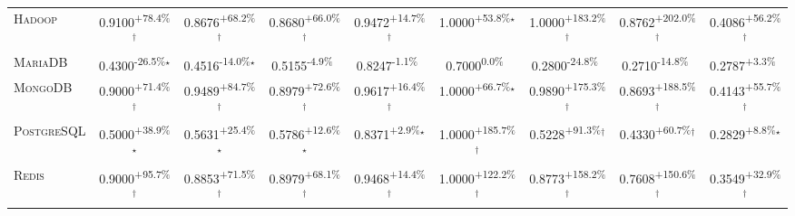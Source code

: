 \begin{table}[htbp]
\begin{tabular}{l|cccc|cccc}
\textsc{Hadoop} & \cellcolor{green!30}0.9100\textsuperscript{+78.4\%}$^\dagger$ & \cellcolor{green!30}0.8676\textsuperscript{+68.2\%}$^\dagger$ & \cellcolor{green!30}0.8680\textsuperscript{+66.0\%}$^\dagger$ & \cellcolor{green!30}0.9472\textsuperscript{+14.7\%}$^\dagger$ & \cellcolor{green!30}1.0000\textsuperscript{+53.8\%}$^\star$ & \cellcolor{green!30}1.0000\textsuperscript{+183.2\%}$^\dagger$ & \cellcolor{green!30}0.8762\textsuperscript{+202.0\%}$^\dagger$ & \cellcolor{green!30}0.4086\textsuperscript{+56.2\%}$^\dagger$ \\
\textsc{MariaDB} & \cellcolor{red!30}0.4300\textsuperscript{-26.5\%}$^\star$ & \cellcolor{red!30}0.4516\textsuperscript{-14.0\%}$^\star$ & \cellcolor{red!30}0.5155\textsuperscript{-4.9\%}$^{\,\,\,}$ & \cellcolor{red!30}0.8247\textsuperscript{-1.1\%}$^{\,\,\,}$ & \cellcolor{red!30}0.7000\textsuperscript{0.0\%}$^{\,\,\,}$ & \cellcolor{red!30}0.2800\textsuperscript{-24.8\%}$^{\,\,\,}$ & \cellcolor{red!30}0.2710\textsuperscript{-14.8\%}$^{\,\,\,}$ & \cellcolor{green!30}0.2787\textsuperscript{+3.3\%}$^{\,\,\,}$ \\
\textsc{MongoDB} & \cellcolor{green!30}0.9000\textsuperscript{+71.4\%}$^\dagger$ & \cellcolor{green!30}0.9489\textsuperscript{+84.7\%}$^\dagger$ & \cellcolor{green!30}0.8979\textsuperscript{+72.6\%}$^\dagger$ & \cellcolor{green!30}0.9617\textsuperscript{+16.4\%}$^\dagger$ & \cellcolor{green!30}1.0000\textsuperscript{+66.7\%}$^\star$ & \cellcolor{green!30}0.9890\textsuperscript{+175.3\%}$^\dagger$ & \cellcolor{green!30}0.8693\textsuperscript{+188.5\%}$^\dagger$ & \cellcolor{green!30}0.4143\textsuperscript{+55.7\%}$^\dagger$ \\
\textsc{PostgreSQL} & \cellcolor{green!30}0.5000\textsuperscript{+38.9\%}$^\star$ & \cellcolor{green!30}0.5631\textsuperscript{+25.4\%}$^\star$ & \cellcolor{green!30}0.5786\textsuperscript{+12.6\%}$^\star$ & \cellcolor{green!30}0.8371\textsuperscript{+2.9\%}$^\star$ & \cellcolor{green!30}1.0000\textsuperscript{+185.7\%}$^\dagger$ & \cellcolor{green!30}0.5228\textsuperscript{+91.3\%}$^\dagger$ & \cellcolor{green!30}0.4330\textsuperscript{+60.7\%}$^\dagger$ & \cellcolor{green!30}0.2829\textsuperscript{+8.8\%}$^\star$ \\
\textsc{Redis} & \cellcolor{green!30}0.9000\textsuperscript{+95.7\%}$^\dagger$ & \cellcolor{green!30}0.8853\textsuperscript{+71.5\%}$^\dagger$ & \cellcolor{green!30}0.8979\textsuperscript{+68.1\%}$^\dagger$ & \cellcolor{green!30}0.9468\textsuperscript{+14.4\%}$^\dagger$ & \cellcolor{green!30}1.0000\textsuperscript{+122.2\%}$^\dagger$ & \cellcolor{green!30}0.8773\textsuperscript{+158.2\%}$^\dagger$ & \cellcolor{green!30}0.7608\textsuperscript{+150.6\%}$^\dagger$ & \cellcolor{green!30}0.3549\textsuperscript{+32.9\%}$^\dagger$ \\

\end{tabular}
\end{table}
